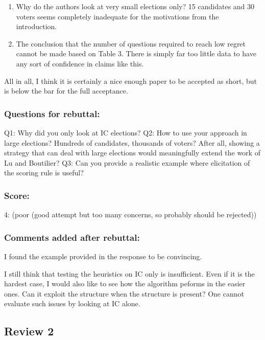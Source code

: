 \documentclass[version=3.21, pagesize, twoside=off, bibliography=totoc, DIV=calc, fontsize=12pt, a4paper]{scrartcl}
\begin{document}
\begin{enumerate}
\begin{enumerate}
		\item Why do the authors look at very small elections only? 15 candidates and 30 voters seems completely inadequate for the motivations from the introduction.
		
		\item The conclusion that the number of questions required to reach low regret cannot be made based on Table 3. There is simply far too little data to have any sort of confidence in claims like this.	
	\end{enumerate}

\end{enumerate}

All in all, I think it is certainly a nice enough paper to be accepted as short, but is below the bar for the full acceptance.

\subsubsection*{Questions for rebuttal:}
Q1: Why did you only look at IC elections?
\newline Q2: How to use your approach in large elections? Hundreds of candidates, thousands of voters? After all, showing a strategy that can deal with large elections would meaningfully extend the work of Lu and Boutilier?
\newline Q3: Can you provide a realistic example where elicitation of the scoring rule is useful?
\subsubsection*{Score:}	
4: (poor (good attempt but too many concerns, so probably should be rejected))

\subsubsection*{Comments added after rebuttal:}
I found the example provided in the response to be convincing.

I still think that testing the heuristics on IC only is insufficient. Even if it is the hardest case, I would also like to see how the algorithm peforms in the easier ones. Can it exploit the structure when the structure is present? One cannot evaluate such issues by looking at IC alone.

\subsection{Review 2}
\end{document}
